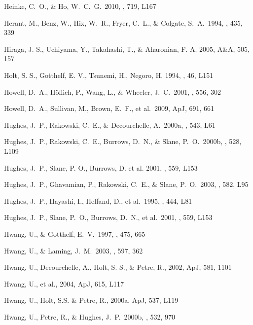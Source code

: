 \documentclass[11pt,a4paper]{article}
\begin{document}
{\begin{multicols}{2}
{\begin{thebibliography}{99}
 Heinke, C.~O., \& Ho,
  W.~C.~G.\ 2010, \apj, 719, L167

Herant, M., Benz, W., Hix,
  W.~R., Fryer, C.~L., \& Colgate, S.~A.~1994, \apj, 435, 339
	
Hiraga, J. S., Uchiyama, Y., Takahashi, T., \& Aharonian, F. A. 2005, A\&A, 505, 157

Holt, S. S., Gotthelf, E. V., Tsunemi, H., Negoro, H. 1994,
\pasj, 46, L151

 Howell, D.~A., 
H{\"o}flich, P., Wang, L., \& Wheeler, J.~C.\ 2001, \apj, 556, 302 

 Howell, D.~A., Sullivan,
M., Brown, E.~F., et al.\ 2009, ApJ, 691, 661 

 Hughes, J.~P., Rakowski, 
C.~E., \& Decourchelle, A.\ 2000a, \apj, 543, L61 

 Hughes, J.~P., Rakowski, 
C.~E., Burrows, D.~N., \& Slane, P.~O.\ 2000b, \apj, 528, L109 

 Hughes, J.~P., Slane, P. O., Burrows, D. et al.
2001, \apj, 559, L153


 Hughes, J.~P., 
Ghavamian, P., Rakowski, C.~E., \& Slane, P.~O.\ 2003, \apj, 582, L95


 Hughes, J.~P., Hayashi, 
I., Helfand, D., et al.\ 1995, \apj, 444, L81 

 Hughes, J.~P., Slane, 
P.~O., Burrows, D.~N., et al.\ 2001, \apj, 559, L153 

 Hwang, U., \& Gotthelf,
  E.~V.\ 1997, \apj, 475, 665

 Hwang, U., \& Laming,
  J.~M.\ 2003, \apj, 597, 362

Hwang, U., Decourchelle, A., Holt, S. S., \& Petre, R., 2002, ApJ, 581, 1101

Hwang, U., et al., 2004, ApJ, 615, L117 

Hwang, U., Holt, S.S. \& Petre, R., 2000a, ApJ, 537, L119

 Hwang, U., Petre, R., 
\& Hughes, J.~P.\ 2000b, \apj, 532, 970 



\end{thebibliography}}
\end{multicols}}
\end{document}
